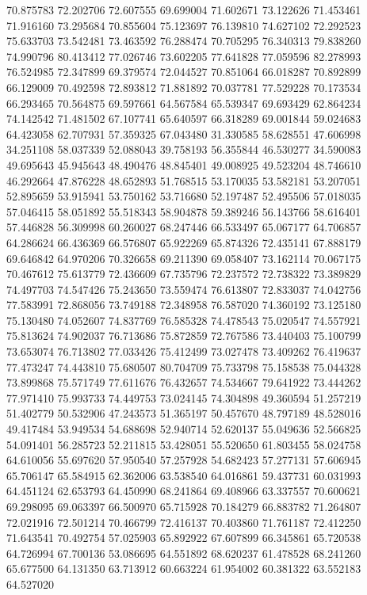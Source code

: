 70.875783
72.202706
72.607555
69.699004
71.602671
73.122626
71.453461
71.916160
73.295684
70.855604
75.123697
76.139810
74.627102
72.292523
75.633703
73.542481
73.463592
76.288474
70.705295
76.340313
79.838260
74.990796
80.413412
77.026746
73.602205
77.641828
77.059596
82.278993
76.524985
72.347899
69.379574
72.044527
70.851064
66.018287
70.892899
66.129009
70.492598
72.893812
71.881892
70.037781
77.529228
70.173534
66.293465
70.564875
69.597661
64.567584
65.539347
69.693429
62.864234
74.142542
71.481502
67.107741
65.640597
66.318289
69.001844
59.024683
64.423058
62.707931
57.359325
67.043480
31.330585
58.628551
47.606998
34.251108
58.037339
52.088043
39.758193
56.355844
46.530277
34.590083
49.695643
45.945643
48.490476
48.845401
49.008925
49.523204
48.746610
46.292664
47.876228
48.652893
51.768515
53.170035
53.582181
53.207051
52.895659
53.915941
53.750162
53.716680
52.197487
52.495506
57.018035
57.046415
58.051892
55.518343
58.904878
59.389246
56.143766
58.616401
57.446828
56.309998
60.260027
68.247446
66.533497
65.067177
64.706857
64.286624
66.436369
66.576807
65.922269
65.874326
72.435141
67.888179
69.646842
64.970206
70.326658
69.211390
69.058407
73.162114
70.067175
70.467612
75.613779
72.436609
67.735796
72.237572
72.738322
73.389829
74.497703
74.547426
75.243650
73.559474
76.613807
72.833037
74.042756
77.583991
72.868056
73.749188
72.348958
76.587020
74.360192
73.125180
75.130480
74.052607
74.837769
76.585328
74.478543
75.020547
74.557921
75.813624
74.902037
76.713686
75.872859
72.767586
73.440403
75.100799
73.653074
76.713802
77.033426
75.412499
73.027478
73.409262
76.419637
77.473247
74.443810
75.680507
80.704709
75.733798
75.158538
75.044328
73.899868
75.571749
77.611676
76.432657
74.534667
79.641922
73.444262
77.971410
75.993733
74.449753
73.024145
74.304898
49.360594
51.257219
51.402779
50.532906
47.243573
51.365197
50.457670
48.797189
48.528016
49.417484
53.949534
54.688698
52.940714
52.620137
55.049636
52.566825
54.091401
56.285723
52.211815
53.428051
55.520650
61.803455
58.024758
64.610056
55.697620
57.950540
57.257928
54.682423
57.277131
57.606945
65.706147
65.584915
62.362006
63.538540
64.016861
59.437731
60.031993
64.451124
62.653793
64.450990
68.241864
69.408966
63.337557
70.600621
69.298095
69.063397
66.500970
65.715928
70.184279
66.883782
71.264807
72.021916
72.501214
70.466799
72.416137
70.403860
71.761187
72.412250
71.643541
70.492754
57.025903
65.892922
67.607899
66.345861
65.720538
64.726994
67.700136
53.086695
64.551892
68.620237
61.478528
68.241260
65.677500
64.131350
63.713912
60.663224
61.954002
60.381322
63.552183
64.527020
